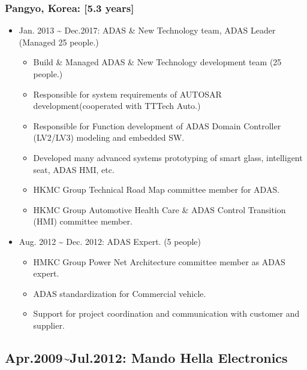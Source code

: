 \documentclass[12pt,a4paper]{article}
\begin{document}
\subsubsection{Pangyo, Korea: [5.3 years]}
\begin{itemize}
\item Jan. 2013 {\textasciitilde} Dec.2017: ADAS \& New Technology team, ADAS Leader (Managed 25 people.)

\begin{itemize}
\item Build \& Managed ADAS \& New Technology development team (25 people.)


\item Responsible for system requirements of AUTOSAR development(cooperated with TTTech Auto.)


\item Responsible for Function development of ADAS Domain Controller (LV2/LV3) modeling and embedded SW.


\item Developed many advanced systems prototyping of smart glass, intelligent seat, ADAS HMI, etc.


\item HKMC Group Technical Road Map committee member for ADAS.


\item HKMC Group Automotive Health Care \& ADAS Control Transition (HMI) committee member.

\end{itemize}

\item Aug. 2012 {\textasciitilde} Dec. 2012: ADAS Expert. (5 people)

\begin{itemize}
\item HMKC Group Power Net Architecture committee member as ADAS expert.


\item ADAS standardization for Commercial vehicle.


\item Support for project coordination and communication with customer and supplier.

\end{itemize}
\end{itemize}
\subsection{Apr.2009{\textasciitilde}Jul.2012: Mando Hella Electronics}
\end{document}
